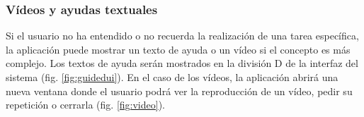 \subsubsection{Vídeos y ayudas textuales}

Si el usuario no ha entendido o no recuerda la realización de una tarea específica, la aplicación puede mostrar un texto de ayuda o un vídeo si el concepto es más complejo. Los textos de ayuda serán mostrados en la división D de la interfaz del sistema (fig. \ref{fig:guidedui}). En el caso de los vídeos, la aplicación abrirá una nueva ventana donde el usuario podrá ver la reproducción de un vídeo, pedir su repetición o cerrarla (fig. \ref{fig:video}).




